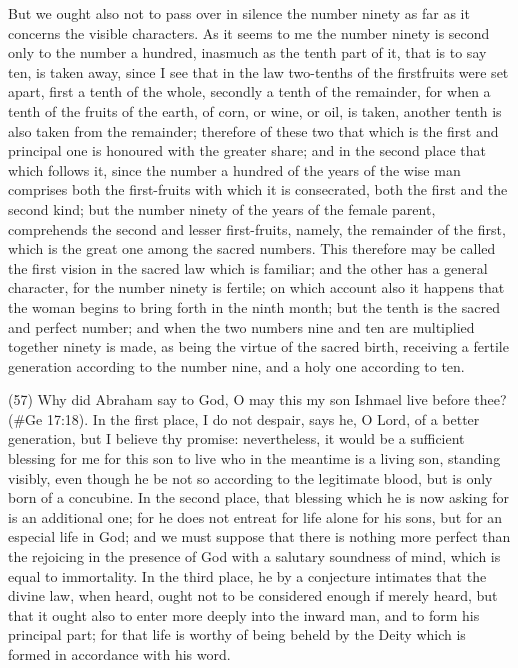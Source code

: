 But we ought also not to pass over in silence the number ninety as far as it concerns the visible
characters. As it seems to me the number ninety is second only to the number a hundred,
inasmuch as the tenth part of it, that is to say ten, is taken away, since I see that in the law
two-tenths of the firstfruits were set apart, first a tenth of the whole, secondly a tenth of the
remainder, for when a tenth of the fruits of the earth, of corn, or wine, or oil, is taken, another tenth
is also taken from the remainder; therefore of these two that which is the first and principal one is
honoured with the greater share; and in the second place that which follows it, since the number a
hundred of the years of the wise man comprises both the first-fruits with which it is consecrated,
both the first and the second kind; but the number ninety of the years of the female parent,
comprehends the second and lesser first-fruits, namely, the remainder of the first, which is the
great one among the sacred numbers. This therefore may be called the first vision in the sacred
law which is familiar; and the other has a general character, for the number ninety is fertile; on
which account also it happens that the woman begins to bring forth in the ninth month; but the tenth
is the sacred and perfect number; and when the two numbers nine and ten are multiplied together
ninety is made, as being the virtue of the sacred birth, receiving a fertile generation according to
the number nine, and a holy one according to ten.

(57) Why did Abraham say to God, O may this my son Ishmael live before thee? (\#Ge 17:18).
In the first place, I do not despair, says he, O Lord, of a better generation, but I believe thy
promise: nevertheless, it would be a sufficient blessing for me for this son to live who in the
meantime is a living son, standing visibly, even though he be not so according to the legitimate
blood, but is only born of a concubine. In the second place, that blessing which he is now asking for
is an additional one; for he does not entreat for life alone for his sons, but for an especial life in
God; and we must suppose that there is nothing more perfect than the rejoicing in the presence of
God with a salutary soundness of mind, which is equal to immortality. In the third place, he by a
conjecture intimates that the divine law, when heard, ought not to be considered enough if merely
heard, but that it ought also to enter more deeply into the inward man, and to form his principal part;
for that life is worthy of being beheld by the Deity which is formed in accordance with his word.

